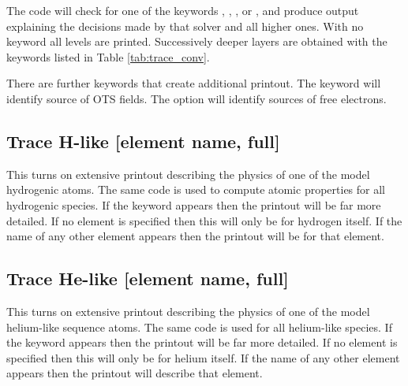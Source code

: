 The code will check for one of the keywords
, , ,
or ,
and produce output explaining the decisions made by that
solver and all higher ones.
With no keyword all levels are printed.
Successively deeper layers are obtained with the keywords listed in
Table \ref{tab:trace_conv}.

There are further keywords that create additional printout.
The 
keyword will identify source of OTS fields.
The  option will identify
sources of free electrons.

\subsection{Trace H-like [element name, full]}

This turns on extensive printout describing the physics of one of the
model hydrogenic atoms. The same code is used to compute atomic properties
for all hydrogenic species.  If the keyword  appears then the printout
will be far more detailed.  If no element is specified then this will only
be for hydrogen itself.  If the name of any other element appears then the
printout will be for that element.

\subsection{Trace He-like [element name, full]}

This turns on extensive printout describing the physics of one of the
model helium-like sequence atoms.  The same code is used for all helium-like
species.
If the keyword  appears then the printout will be far more
detailed.
If no element is specified then this will only be for helium
itself.
If the name of any other element appears then the printout will
describe that element.

